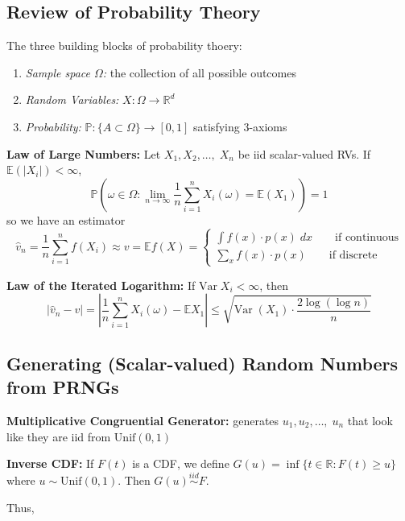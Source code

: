 \documentclass[12pt]{article}
\renewcommand{\hat}[1]{\widehat{#1}}
\renewcommand{\P}{\mathbb{P}}
\newcommand{\R}{\mathbb{R}}
\newcommand{\E}{\mathbb{E}}
\newcommand{\Var}{\text{Var}\;}
\newcommand{\abs}[1]{\left\vert #1 \right\vert}
\newcommand{\iid}{\overset{iid}{\sim}}
\begin{document}
    \subsection{Review of Probability Theory}
        The three building blocks of probability thoery:
        \begin{enumerate}
            \item \emph{Sample space $\Omega$:} the collection of all possible outcomes 
            \item \emph{Random Variables:} $X: \Omega \to \R^d$ 
            \item \emph{Probability:} $\P: \{A \subset \Omega\} \to [0, 1]$ satisfying 3-axioms
        \end{enumerate}

        \textbf{Law of Large Numbers:} Let $X_1, X_2, \dots, \; X_n$ be iid scalar-valued RVs. If $\E(\abs{X_i}) < \infty$, 
        \[\P(\omega\in \Omega: \lim_{n\to \infty} \frac{1}{n}\sum_{i=1}^n X_i(\omega) = \E(X_1))=1\] 
        so we have an estimator 
        \[\hat v_n = \frac{1}{n} \sum_{i=1}^n f(X_i) \approx v = \E f(X) = \begin{cases}
            \int f(x) \cdot p(x)\; dx \qquad \text{if continuous}\\ 
            \sum_x f(x) \cdot p(x) \qquad \text{if discrete}
        \end{cases}\]

        \textbf{Law of the Iterated Logarithm:} If $\Var X_i < \infty$, then 
        \[\abs{\hat v_n - v} = \abs{\frac{1}{n} \sum_{i=1}^n X_i(\omega) - \E X_1} \leq \sqrt{\Var(X_1) \cdot \frac{2 \log(\log n)}{n}}\] 

    \subsection{Generating (Scalar-valued) Random Numbers from PRNGs}
        \textbf{Multiplicative Congruential Generator:} generates $u_1, u_2, \dots,\; u_n$ that look like they are iid from $\text{Unif}(0, 1)$

        \textbf{Inverse CDF:} If $F(t)$ is a CDF, we define $G(u) = \inf\{t\in \R: F(t) \geq u\}$ where $u \sim \text{Unif}(0, 1)$. Then $G(u) \iid F$.

        Thus, 
        \begin{center}
        \end{center}
\end{document}
